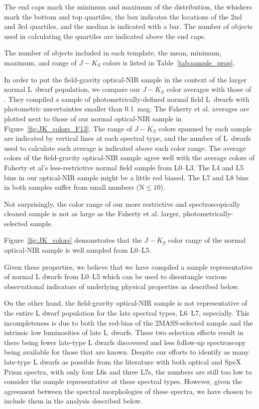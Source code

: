\documentclass[12pt,preprint]{aastex}
\begin{document}
The end caps mark the minimum and maximum of the distribution, the whiskers mark the bottom and top quartiles, the box indicates the locations of the 2nd and 3rd quartiles, and the median is indicated with a bar. The number of objects used in calculating the quartiles are indicated above the end caps.

The number of objects included in each template, the mean, minimum, maximum, and range of $J-K_S$ colors is listed in Table~\ref{tab:sample_prop}. 

In order to put the field-gravity optical-NIR sample in the context of the larger normal L~dwarf population, we compare our $J-K_S$ color averages with those of \citet{Faherty13_0355}. 
They compiled a sample of photometrically-defined normal field L~dwarfs with photometric uncertainties smaller than 0.1~mag. 
The Faherty et al. averages are plotted next to those of our normal optical-NIR sample in Figure~\ref{fig:JK_colors_F13}. 
The range of $J-K_S$ colors spanned by each sample are indicated by vertical lines at each spectral type, and the number of L~dwarfs used to calculate each average is indicated above each color range. 
The average colors of the field-gravity optical-NIR sample agree well with the average colors of Faherty et al's less-restrictive normal field sample from L0--L3.
The L4 and L5 bins in our optical-NIR sample might be a little red biased.
The L7 and L8 bins in both samples suffer from small numbers (N$\le10$). 

Not surprisingly, the color range of our more restrictive and spectroscopically cleaned sample is not as large as the Faherty et al. larger, photometrically-selected sample. 


Figure~\ref{fig:JK_colors} demonstrates that the $J-K_S$ color range of the normal optical-NIR sample is well sampled from L0--L5. 

Given these properties, we believe that we have compiled a sample representative of normal L dwarfs from L0--L5 which can be used to disentangle various observational indicators of underlying physical properties as described below.

On the other hand, the field-gravity optical-NIR sample is not representative of the entire L dwarf population for the late spectral types, L6--L7, especially. 
This incompleteness is due to both the red-bias of the 2MASS-selected sample and the intrinsic low luminosities of late L~dwarfs.
These two selection effects result in there being fewer late-type L dwarfs discovered and less follow-up spectroscopy being available for those that are known.
Despite our efforts to identify as many late-type L dwarfs as possible from the literature with both optical and SpeX Prism spectra, with only four L6s and three L7s, the numbers are still too low to consider the sample representative at these spectral types.
However, given the agreement between the spectral morphologies of these spectra, we have chosen to include them in the analysis described below.
\end{document}
